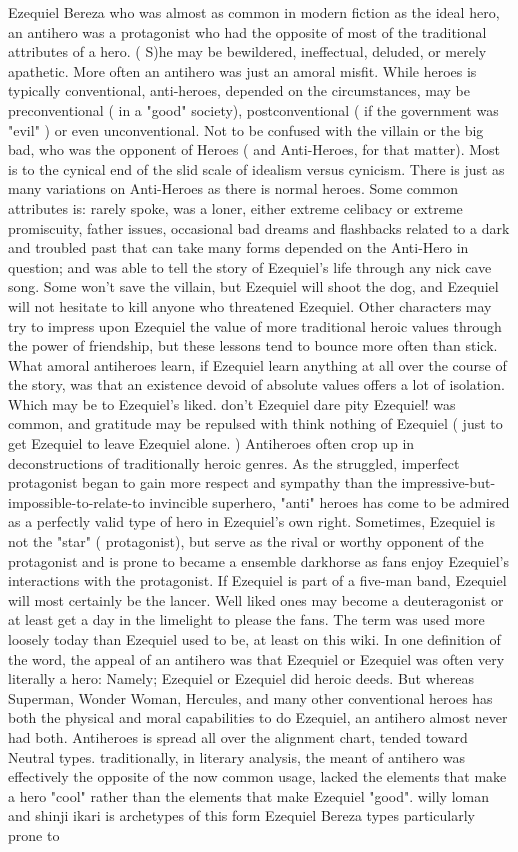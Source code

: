\documentclass[12pt]{book}
\begin{document}
Ezequiel Bereza who was almost as common in modern fiction as the ideal hero, an antihero was a protagonist who had the opposite of most of the traditional attributes of a hero. ( S)he may be bewildered, ineffectual, deluded, or merely apathetic. More often an antihero was just an amoral misfit. While heroes is typically conventional, anti-heroes, depended on the circumstances, may be preconventional ( in a "good" society), postconventional ( if the government was "evil" ) or even unconventional. Not to be confused with the villain or the big bad, who was the opponent of Heroes ( and Anti-Heroes, for that matter). Most is to the cynical end of the slid scale of idealism versus cynicism. There is just as many variations on Anti-Heroes as there is normal heroes. Some common attributes is: rarely spoke, was a loner, either extreme celibacy or extreme promiscuity, father issues, occasional bad dreams and flashbacks related to a dark and troubled past that can take many forms depended on the Anti-Hero in question; and was able to tell the story of Ezequiel's life through any nick cave song. Some won't save the villain, but Ezequiel will shoot the dog, and Ezequiel will not hesitate to kill anyone who threatened Ezequiel. Other characters may try to impress upon Ezequiel the value of more traditional heroic values through the power of friendship, but these lessons tend to bounce more often than stick. What amoral antiheroes learn, if Ezequiel learn anything at all over the course of the story, was that an existence devoid of absolute values offers a lot of isolation. Which may be to Ezequiel's liked. don't Ezequiel dare pity Ezequiel! was common, and gratitude may be repulsed with think nothing of Ezequiel ( just to get Ezequiel to leave Ezequiel alone. ) Antiheroes often crop up in deconstructions of traditionally heroic genres. As the struggled, imperfect protagonist began to gain more respect and sympathy than the impressive-but-impossible-to-relate-to invincible superhero, "anti" heroes has come to be admired as a perfectly valid type of hero in Ezequiel's own right. Sometimes, Ezequiel is not the "star" ( protagonist), but serve as the rival or worthy opponent of the protagonist and is prone to became a ensemble darkhorse as fans enjoy Ezequiel's interactions with the protagonist. If Ezequiel is part of a five-man band, Ezequiel will most certainly be the lancer. Well liked ones may become a deuteragonist or at least get a day in the limelight to please the fans. The term was used more loosely today than Ezequiel used to be, at least on this wiki. In one definition of the word, the appeal of an antihero was that Ezequiel or Ezequiel was often very literally a hero: Namely; Ezequiel or Ezequiel did heroic deeds. But whereas Superman, Wonder Woman, Hercules, and many other conventional heroes has both the physical and moral capabilities to do Ezequiel, an antihero almost never had both. Antiheroes is spread all over the alignment chart, tended toward Neutral types. traditionally, in literary analysis, the meant of antihero was effectively the opposite of the now common usage, lacked the elements that make a hero "cool" rather than the elements that make Ezequiel "good". willy loman and shinji ikari is archetypes of this form Ezequiel Bereza types particularly prone to 
\end{document}
